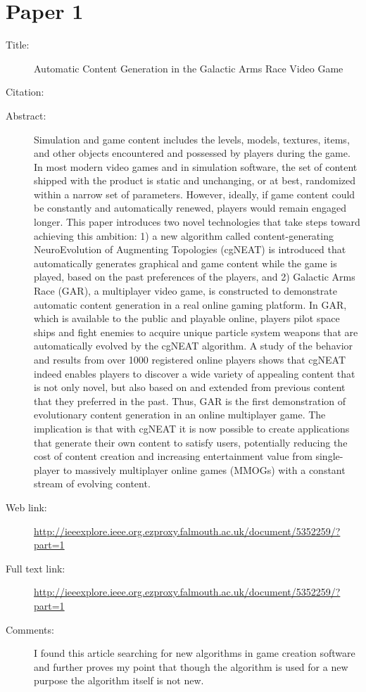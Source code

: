 \documentclass{scrartcl}
\begin{document}
\section*{Paper 1}
\begin{description}
\item[Title:] Automatic Content Generation in the Galactic Arms Race Video Game
\item[Citation:] \cite{hastings2009automatic}
\item[Abstract:] Simulation and game content includes the levels, models, textures, items, and other objects encountered and possessed by players during the game. In most modern video games and in simulation software, the set of content shipped with the product is static and unchanging, or at best, randomized within a narrow set of parameters. However, ideally, if game content could be constantly and automatically renewed, players would remain engaged longer. This paper introduces two novel technologies that take steps toward achieving this ambition: 1) a new algorithm called content-generating NeuroEvolution of Augmenting Topologies (cgNEAT) is introduced that automatically generates graphical and game content while the game is played, based on the past preferences of the players, and 2) Galactic Arms Race (GAR), a multiplayer video game, is constructed to demonstrate automatic content generation in a real online gaming platform. In GAR, which is available to the public and playable online, players pilot space ships and fight enemies to acquire unique particle system weapons that are automatically evolved by the cgNEAT algorithm. A study of the behavior and results from over 1000 registered online players shows that cgNEAT indeed enables players to discover a wide variety of appealing content that is not only novel, but also based on and extended from previous content that they preferred in the past. Thus, GAR is the first demonstration of evolutionary content generation in an online multiplayer game. The implication is that with cgNEAT it is now possible to create applications that generate their own content to satisfy users, potentially reducing the cost of content creation and increasing entertainment value from single-player to massively multiplayer online games (MMOGs) with a constant stream of evolving content.
\item[Web link:] \url{http://ieeexplore.ieee.org.ezproxy.falmouth.ac.uk/document/5352259/?part=1}
\item[Full text link:] \url{http://ieeexplore.ieee.org.ezproxy.falmouth.ac.uk/document/5352259/?part=1}
\item[Comments:]  I found this article searching for new algorithms in game creation software and further proves my point that though the algorithm is used for a new purpose the algorithm itself is not new.
\end{description}
\end{document}
